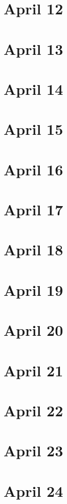 \section{April 12}

\section{April 13}

\section{April 14}

\section{April 15}

\section{April 16}

\section{April 17}

\section{April 18}

\section{April 19}

\section{April 20}

\section{April 21}

\section{April 22}

\section{April 23}

\section{April 24}

